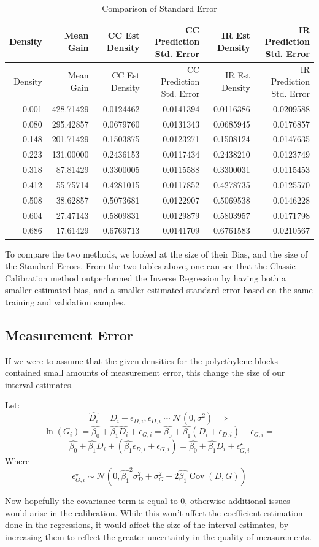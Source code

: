 \documentclass[]{article}
\newcommand{\Cov}{\operatorname{Cov}}
\begin{document}
\begin{longtable}[]{@{}rrrrrr@{}}
\caption{Comparison of Standard Error}\tabularnewline
\toprule
Density & Mean Gain & CC Est Density & CC Prediction Std. Error & IR Est
Density & IR Prediction Std. Error\tabularnewline
\midrule
\endfirsthead
\toprule
Density & Mean Gain & CC Est Density & CC Prediction Std. Error & IR Est
Density & IR Prediction Std. Error\tabularnewline
\midrule
\endhead
0.001 & 428.71429 & -0.0124462 & 0.0141394 & -0.0116386 &
0.0209588\tabularnewline
0.080 & 295.42857 & 0.0679760 & 0.0131343 & 0.0685945 &
0.0176857\tabularnewline
0.148 & 201.71429 & 0.1503875 & 0.0123271 & 0.1508124 &
0.0147635\tabularnewline
0.223 & 131.00000 & 0.2436153 & 0.0117434 & 0.2438210 &
0.0123749\tabularnewline
0.318 & 87.81429 & 0.3300005 & 0.0115588 & 0.3300031 &
0.0115453\tabularnewline
0.412 & 55.75714 & 0.4281015 & 0.0117852 & 0.4278735 &
0.0125570\tabularnewline
0.508 & 38.62857 & 0.5073681 & 0.0122907 & 0.5069538 &
0.0146228\tabularnewline
0.604 & 27.47143 & 0.5809831 & 0.0129879 & 0.5803957 &
0.0171798\tabularnewline
0.686 & 17.61429 & 0.6769713 & 0.0141709 & 0.6761583 &
0.0210567\tabularnewline
\bottomrule
\end{longtable}

To compare the two methods, we looked at the size of their Bias, and the
size of the Standard Errors. From the two tables above, one can see that
the Classic Calibration method outperformed the Inverse Regression by
having both a smaller estimated bias, and a smaller estimated standard
error based on the same training and validation samples.

\subsection{Measurement Error}\label{measurement-error}

If we were to assume that the given densities for the polyethylene
blocks contained small amounts of measurement error, this change the
size of our interval estimates.

Let: \[
  \hat{D_{i}} =
  D_{i} + \epsilon_{D,i},
  \epsilon_{D,i} \sim \mathcal{N}(0, \sigma^{2}) \implies
\] \[
  \ln(G_{i}) = 
  \hat{\beta_{0}} + \hat{\beta_{1}}\hat{D_{i}} + \epsilon_{G,i} =
  \hat{\beta_{0}} + \hat{\beta_{1}}(D_{i} + \epsilon_{D,i}) + \epsilon_{G,i} =
\] \[
  \hat{\beta_{0}} + \hat{\beta_{1}}D_{i} + (\hat{\beta_{1}}\epsilon_{D,i} + \epsilon_{G,i}) =
  \hat{\beta_{0}} + \hat{\beta_{1}}D_{i} + \epsilon^{\star}_{G,i}
\] Where \[
  \epsilon^{\star}_{G,i} \sim
  \mathcal{N}\left( 0, \hat{\beta_{1}}^{2}\sigma_{D}^{2}+\sigma_{G}^{2}+2\hat{\beta_{1}}\Cov(D,G) \right)
\]

Now hopefully the covariance term is equal to 0, otherwise additional
issues would arise in the calibration. While this won't affect the
coefficient estimation done in the regressions, it would affect the size
of the interval estimates, by increasing them to reflect the greater
uncertainty in the quality of measurements.
\end{document}
